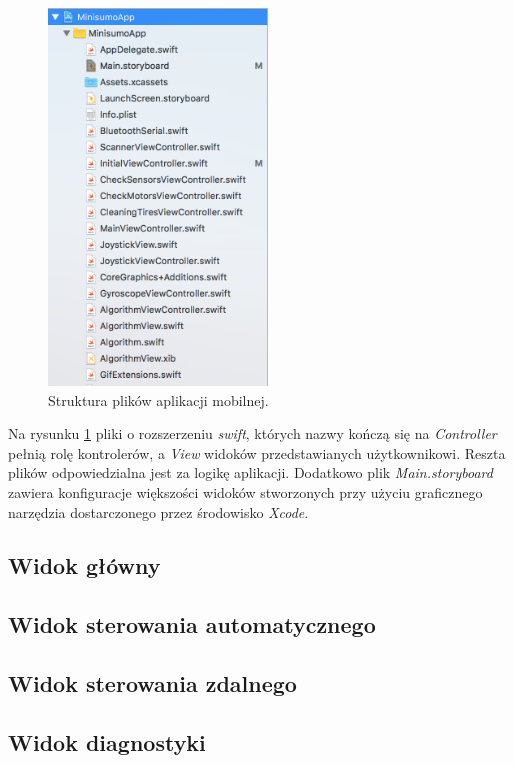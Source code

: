 \begin{figure}[H]
	\centering
		\includegraphics[width=0.75\linewidth, height=10cm, keepaspectratio]{pic05/structure.png}
	\caption{Struktura plików aplikacji mobilnej.}
	\label{fig:structure}	
\end{figure}

Na rysunku \ref{fig:structure} pliki o rozszerzeniu \textit{swift}, których nazwy kończą się na \textit{Controller} pełnią rolę kontrolerów, a \textit{View} widoków przedstawianych użytkownikowi. Reszta plików odpowiedzialna jest za logikę aplikacji. Dodatkowo plik \textit{Main.storyboard} zawiera konfiguracje większości widoków stworzonych przy użyciu graficznego narzędzia dostarczonego przez środowisko \textit{Xcode}.

\subsection{Widok główny}

\subsection{Widok sterowania automatycznego}
\subsection{Widok sterowania zdalnego}
\subsection{Widok diagnostyki}